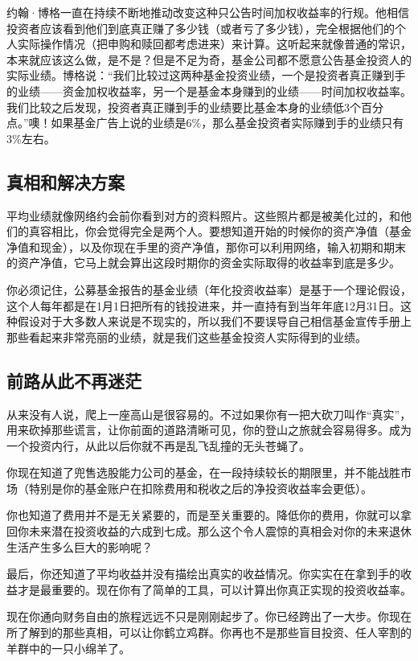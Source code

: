 约翰·博格一直在持续不断地推动改变这种只公告时间加权收益率的行规。他相信投资者应该看到他们到底真正赚了多少钱（或者亏了多少钱），完全根据他们的个人实际操作情况（把申购和赎回都考虑进来）来计算。这听起来就像普通的常识，本来就应该这么做，是不是？但是不足为奇，基金公司都不愿意公告基金投资人的实际业绩。博格说：“我们比较过这两种基金投资业绩，一个是投资者真正赚到手的业绩——资金加权收益率，另一个是基金本身赚到的业绩——时间加权收益率。我们比较之后发现，投资者真正赚到手的业绩要比基金本身的业绩低3个百分点。”噢！如果基金广告上说的业绩是6\%，那么基金投资者实际赚到手的业绩只有3\%左右。

\subsection{真相和解决方案}

平均业绩就像网络约会前你看到对方的资料照片。这些照片都是被美化过的，和他们的真容相比，你会觉得完全是两个人。要想知道开始的时候你的资产净值（基金净值和现金），以及你现在手里的资产净值，那你可以利用网络，输入初期和期末的资产净值，它马上就会算出这段时期你的资金实际取得的收益率到底是多少。

你必须记住，公募基金报告的基金业绩（年化投资收益率）是基于一个理论假设，这个人每年都是在1月1日把所有的钱投进来，并一直持有到当年年底12月31日。这种假设对于大多数人来说是不现实的，所以我们不要误导自己相信基金宣传手册上那些看起来非常亮丽的业绩，就是我们这些基金投资人实际得到的业绩。

\subsection{前路从此不再迷茫}

从来没有人说，爬上一座高山是很容易的。不过如果你有一把大砍刀叫作“真实”，用来砍掉那些谎言，让你前面的道路清晰可见，你的登山之旅就会容易得多。成为一个投资内行，从此以后你就不再是乱飞乱撞的无头苍蝇了。

你现在知道了兜售选股能力公司的基金，在一段持续较长的期限里，并不能战胜市场（特别是你的基金账户在扣除费用和税收之后的净投资收益率会更低）。

你也知道了费用并不是无关紧要的，而是至关重要的。降低你的费用，你就可以拿回你未来潜在投资收益的六成到七成。那么这个令人震惊的真相会对你的未来退休生活产生多么巨大的影响呢？

最后，你还知道了平均收益并没有描绘出真实的收益情况。你实实在在拿到手的收益才是最重要的。现在你有了简单的工具，可以计算出你真正实现的投资收益率。

现在你通向财务自由的旅程远远不只是刚刚起步了。你已经跨出了一大步。你现在所了解到的那些真相，可以让你鹤立鸡群。你再也不是那些盲目投资、任人宰割的羊群中的一只小绵羊了。

